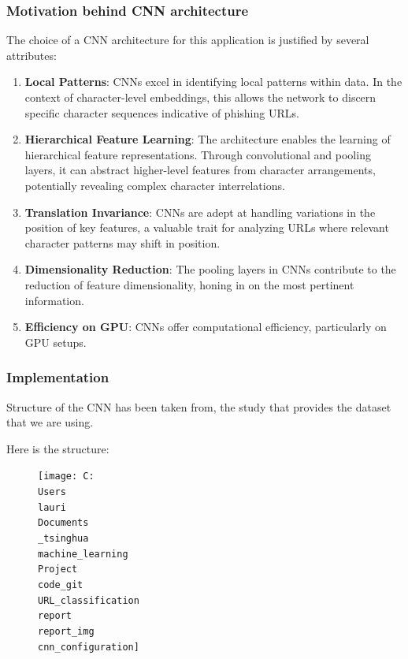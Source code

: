 \documentclass{article}
\begin{document}
    \subsubsection{Motivation behind CNN architecture}

    The choice of a CNN architecture for this application is justified by several attributes:
    \begin{enumerate}
        \item \textbf{Local Patterns}: CNNs excel in identifying local patterns within data.
        In the context of character-level embeddings, this allows the network to discern specific character sequences indicative of phishing URLs.
        \item \textbf{Hierarchical Feature Learning}: The architecture enables the learning of hierarchical feature representations.
        Through convolutional and pooling layers, it can abstract higher-level features from character arrangements, potentially revealing complex character interrelations.
        \item \textbf{Translation Invariance}: CNNs are adept at handling variations in the position of key features, a valuable trait for analyzing URLs where relevant character patterns may shift in position.
        \item \textbf{Dimensionality Reduction}: The pooling layers in CNNs contribute to the reduction of feature dimensionality, honing in on the most pertinent information.
        \item \textbf{Efficiency on GPU}: CNNs offer computational efficiency, particularly on GPU setups.
    \end{enumerate}

    \subsubsection{Implementation}
    Structure of the CNN has been taken from\cite{CharacterLevelCNN}, the study that provides the dataset that we are using.

    Here is the structure:
    \begin{figure}
        \centering
        \texttt{[image: C:\\Users\\lauri\\Documents\\\_tsinghua\\machine\_learning\\Project\\code\_git\\URL\_classification\\report\\report\_img\\cnn\_configuration]}
        \caption{}
        \label{fig:CNN}
    \end{figure}
\end{document}
